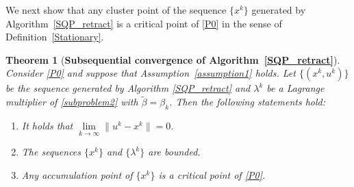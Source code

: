 \documentclass[10pt]{article}
\numberwithin{equation}{section}
\newtheorem{theorem}{Theorem}[section]
\begin{document}
We next show that any cluster point of the sequence $\{x^k\}$ generated by Algorithm~\ref{SQP_retract} is a {\color {black} critical point} of \eqref{P0} in the sense of Definition~\ref{Stationary}.
\begin{theorem}[{{\bf Subsequential convergence of Algorithm~\ref{SQP_retract}}}]\label{convergence2}
Consider \eqref{P0} and suppose that Assumption~\ref{assumption1} holds. Let {\color{black}$\{(x^k, u^k)\}$} be the sequence generated by Algorithm \ref{SQP_retract} and $\lambda^k$ be a Lagrange multiplier of \eqref{subproblem2} with $\widetilde{\beta} = \beta_k$. Then the following statements hold:
\begin{enumerate}[{\rm(i)}]
  \item It holds that $\lim\limits_{k\rightarrow\infty}\|u^k - x^k\| = 0$.
  \item The sequences $\{x^k\}$ and $\{\lambda^k\}$ are bounded.
  \item Any accumulation point of $\{x^k\}$ is a {\color{black}critical point} of \eqref{P0}.
\end{enumerate}
\end{theorem}
\end{document}
